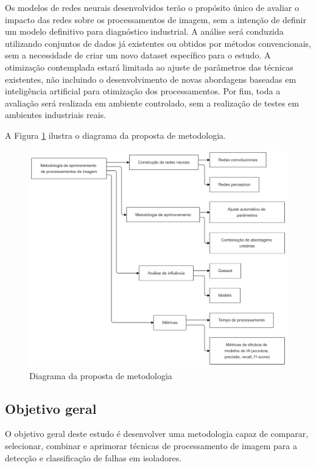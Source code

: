Os modelos de redes neurais desenvolvidos terão o propósito único de avaliar o impacto das redes sobre os processamentos de imagem, sem a intenção de definir um modelo definitivo para diagnóstico industrial. A análise será conduzida utilizando conjuntos de dados já existentes ou obtidos por métodos convencionais, sem a necessidade de criar um novo dataset específico para o estudo. A otimização contemplada estará limitada ao ajuste de parâmetros das técnicas existentes, não incluindo o desenvolvimento de novas abordagens baseadas em inteligência artificial para otimização dos processamentos. Por fim, toda a avaliação será realizada em ambiente controlado, sem a realização de testes em ambientes industriais reais.

A Figura \ref{fig:proposta} ilustra o diagrama da proposta de metodologia.

\begin{figure}[h]
    \centering
    \includegraphics[width=\textwidth]{img/proposta.png}
    \caption{Diagrama da proposta de metodologia}
    \label{fig:proposta}
\end{figure}

\subsection{Objetivo geral}

O objetivo geral deste estudo é desenvolver uma metodologia capaz de comparar, selecionar, combinar e aprimorar técnicas de processamento de imagem para a detecção e classificação de falhas em isoladores.

